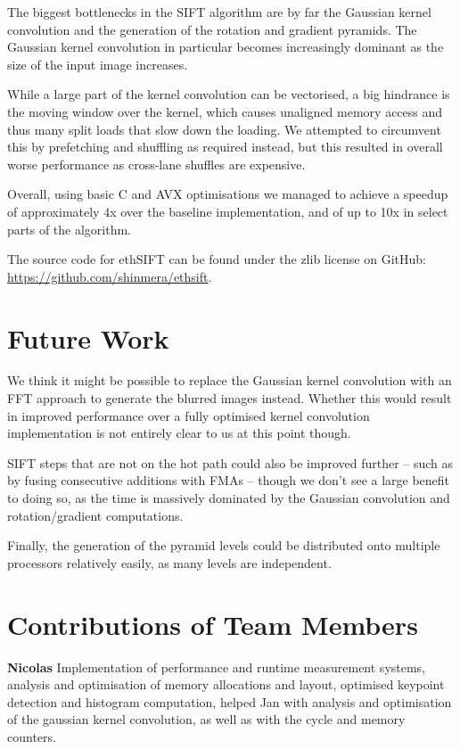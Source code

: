 \documentclass[letterpaper]{article}
\begin{document}
The biggest bottlenecks in the SIFT algorithm are by far the Gaussian kernel convolution and the generation of the rotation and gradient pyramids. The Gaussian kernel convolution in particular becomes increasingly dominant as the size of the input image increases.

While a large part of the kernel convolution can be vectorised, a big hindrance is the moving window over the kernel, which causes unaligned memory access and thus many split loads that slow down the loading. We attempted to circumvent this by prefetching and shuffling as required instead, but this resulted in overall worse performance as cross-lane shuffles are expensive.

Overall, using basic C and AVX optimisations we managed to achieve a speedup of approximately 4x over the baseline implementation, and of up to 10x in select parts of the algorithm.

The source code for ethSIFT can be found under the zlib license on GitHub: \\\url{https://github.com/shinmera/ethsift}.

\section{Future Work}
We think it might be possible to replace the Gaussian kernel convolution with an FFT approach to generate the blurred images instead. Whether this would result in improved performance over a fully optimised kernel convolution implementation is not entirely clear to us at this point though.

SIFT steps that are not on the hot path could also be improved further -- such as by fusing consecutive additions with FMAs -- though we don't see a large benefit to doing so, as the time is massively dominated by the Gaussian convolution and rotation/gradient computations.

Finally, the generation of the pyramid levels could be distributed onto multiple processors relatively easily, as many levels are independent.

\section{Contributions of Team Members}
\textbf{Nicolas} Implementation of performance and runtime measurement systems, analysis and optimisation of memory allocations and layout, optimised keypoint detection and histogram computation, helped Jan with analysis and optimisation of the gaussian kernel convolution, as well as with the cycle and memory counters.
\end{document}
